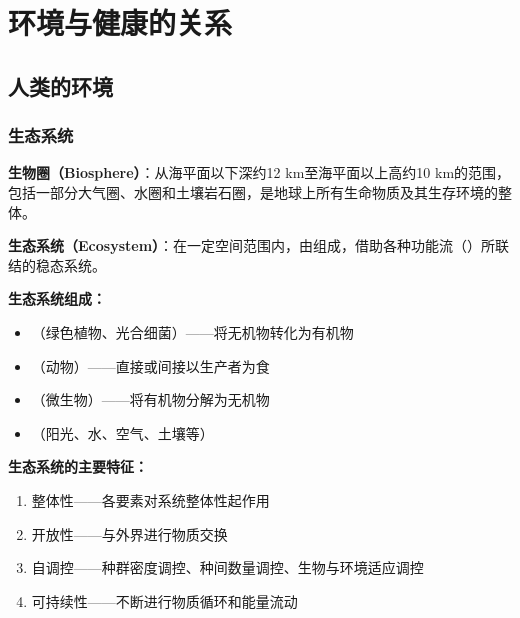 \chapter{环境与健康的关系}
\setcounter{chapter}{2}

\section{人类的环境}

\subsection{生态系统}
\begin{defbox}
\textbf{生物圈（Biosphere）}：从海平面以下深约12 km至海平面以上高约10 km的范围，包括一部分大气圈、水圈和土壤岩石圈，是地球上所有生命物质及其生存环境的整体。
\end{defbox}

\begin{defbox}
\textbf{生态系统（Ecosystem）}：在一定空间范围内，由组成，借助各种功能流（）所联结的稳态系统。
\end{defbox}

\textbf{生态系统组成：}
\begin{itemize}[leftmargin=*]
    \item {}（绿色植物、光合细菌）——将无机物转化为有机物
    \item {}（动物）——直接或间接以生产者为食
    \item {}（微生物）——将有机物分解为无机物
    \item {}（阳光、水、空气、土壤等）
\end{itemize}

\textbf{生态系统的主要特征：}
\begin{enumerate}[leftmargin=*]
    \item 整体性——各要素对系统整体性起作用
    \item 开放性——与外界进行物质交换
    \item 自调控——种群密度调控、种间数量调控、生物与环境适应调控
    \item 可持续性——不断进行物质循环和能量流动
\end{enumerate}

